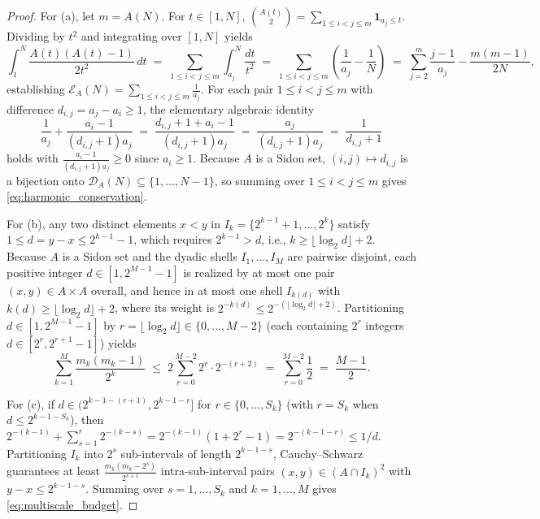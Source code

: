 \documentclass[11pt,reqno]{amsart}
\theoremstyle{definition}
\theoremstyle{remark}
\begin{document}
\begin{proof}
For (a), let $m = A(N)$. For $t \in [1, N]$, $\binom{A(t)}{2} = \sum_{1 \le i < j \le m} \mathbf{1}_{a_j \le t}$. Dividing by $t^2$ and integrating over $[1, N]$ yields
\[
  \int_1^N \frac{A(t)(A(t) - 1)}{2 t^2}\,dt \;=\; \sum_{1 \le i < j \le m} \int_{a_j}^N \frac{dt}{t^2} \;=\; \sum_{1 \le i < j \le m} \left(\frac{1}{a_j} - \frac{1}{N}\right) \;=\; \sum_{j=2}^m \frac{j - 1}{a_j} - \frac{m(m - 1)}{2 N},
\]
establishing $\mathcal{E}_A(N) = \sum_{1 \le i < j \le m} \frac{1}{a_j}$. For each pair $1 \le i < j \le m$ with difference $d_{i,j} = a_j - a_i \ge 1$, the elementary algebraic identity
\[
  \frac{1}{a_j} + \frac{a_i - 1}{(d_{i,j} + 1) a_j} \;=\; \frac{d_{i,j} + 1 + a_i - 1}{(d_{i,j} + 1) a_j} \;=\; \frac{a_j}{(d_{i,j} + 1) a_j} \;=\; \frac{1}{d_{i,j} + 1}
\]
holds with $\frac{a_i - 1}{(d_{i,j} + 1) a_j} \ge 0$ since $a_i \ge 1$. Because $A$ is a Sidon set, $(i, j) \mapsto d_{i,j}$ is a bijection onto $\mathcal{D}_A(N) \subseteq \{1, \dots, N-1\}$, so summing over $1 \le i < j \le m$ gives \eqref{eq:harmonic_conservation}.

For (b), any two distinct elements $x < y$ in $I_k = \{2^{k-1} + 1, \dots, 2^k\}$ satisfy $1 \le d = y - x \le 2^{k-1} - 1$, which requires $2^{k-1} > d$, i.e., $k \ge \lfloor \log_2 d \rfloor + 2$. Because $A$ is a Sidon set and the dyadic shells $I_1, \dots, I_M$ are pairwise disjoint, each positive integer $d \in [1, 2^{M-1}-1]$ is realized by at most one pair $(x, y) \in A \times A$ overall, and hence in at most one shell $I_{k(d)}$ with $k(d) \ge \lfloor \log_2 d \rfloor + 2$, where its weight is $2^{-k(d)} \le 2^{-(\lfloor \log_2 d \rfloor + 2)}$. Partitioning $d \in [1, 2^{M-1}-1]$ by $r = \lfloor \log_2 d \rfloor \in \{0, \dots, M-2\}$ (each containing $2^r$ integers $d \in [2^r, 2^{r+1}-1]$) yields
\[
  \sum_{k=1}^M \frac{m_k(m_k - 1)}{2^k} \;\le\; 2 \sum_{r=0}^{M-2} 2^r \cdot 2^{-(r+2)} \;=\; \sum_{r=0}^{M-2} \frac{1}{2} \;=\; \frac{M - 1}{2}.
\]

For (c), if $d \in (2^{k-1-(r+1)}, 2^{k-1-r}]$ for $r \in \{0, \dots, S_k\}$ (with $r = S_k$ when $d \le 2^{k-1-S_k}$), then $2^{-(k-1)} + \sum_{s=1}^r 2^{-(k-s)} = 2^{-(k-1)}(1 + 2^r - 1) = 2^{-(k-1-r)} \le 1/d$. Partitioning $I_k$ into $2^s$ sub-intervals of length $2^{k-1-s}$, Cauchy--Schwarz guarantees at least $\frac{m_k(m_k - 2^s)}{2^{s+1}}$ intra-sub-interval pairs $(x, y) \in (A \cap I_k)^2$ with $y - x \le 2^{k-1-s}$. Summing over $s = 1, \dots, S_k$ and $k = 1, \dots, M$ gives \eqref{eq:multiscale_budget}.
\end{proof}
\end{document}
